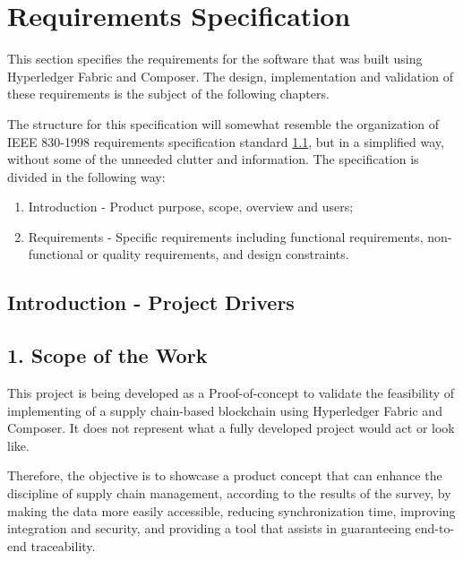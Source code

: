 \section{Requirements Specification}
\label{sec:requirements-specs}
This section specifies the requirements for the software that was built using Hyperledger Fabric and Composer. The design, implementation and validation of these requirements is the subject of the following chapters.

The structure for this specification will somewhat resemble the organization of IEEE 830-1998 requirements specification standard \ref{}, but in a simplified way, without some of the unneeded clutter and information. The specification is divided in the following way:
\begin{enumerate}
	\item Introduction - Product purpose, scope, overview and users;
	\item Requirements - Specific requirements including functional requirements, non-functional or quality requirements, and design constraints.
\end{enumerate}

\subsection{Introduction - Project Drivers}

\subsection*{1. Scope of the Work}
		\par This project is being developed as a Proof-of-concept to validate the feasibility of implementing of a supply chain-based blockchain using Hyperledger Fabric and Composer. It does not represent what a fully developed project would act or look like.

		\par Therefore, the objective is to showcase a product concept that can enhance the discipline of supply chain management, according to the results of the survey, by making the data more easily accessible, reducing synchronization time, improving integration and security, and providing a tool that assists in guaranteeing end-to-end traceability.

